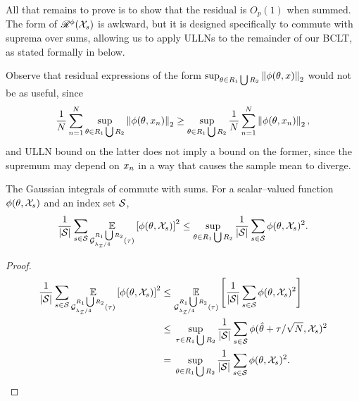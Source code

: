 
All that remains to prove  is to show that the residual is
$O_p(1)$ when summed.  The form of $\mathscr{R}^{\phi}({\mathcal{X}}_s)$ is awkward, but it is
designed specifically to commute with suprema over sums, allowing us to apply
ULLNs to the remainder of our BCLT, as stated formally in
 below.

Observe that residual expressions of the form $\sup_{\theta \in R_1 \bigcup R_2}
\left\Vert \phi(\theta, x)\right\Vert_2$ would not be as useful, since
%
\begin{align*}
%
\meann \sup_{\theta \in R_1 \bigcup R_2} \norm{\phi(\theta, \x_n)}_2 \ge
\sup_{\theta \in R_1 \bigcup R_2} \meann \norm{\phi(\theta, \x_n)}_2,
\end{align*}
%
and ULLN bound on the latter does not imply a bound on the former, since the
supremum may depend on $x_n$ in a way that causes the sample mean to diverge.


\begin{lem}
%
The Gaussian integrals of  commute with sums.
%
For a scalar--valued function $\phi(\theta, {\mathcal{X}}_s)$ and an index set
$\mathcal{S}$,
%
\begin{align*}
%
\means \expect{\normresid{\infoev / 4}{R_1 \bigcup R_2}(\tau)}
              {\phi(\theta, \xvec_s)}^2
            \le
\sup_{\theta \in R_1 \bigcup R_2} \means \phi(\theta, \xvec_s)^2.
%
\end{align*}
%
\begin{proof}
%
\begin{align*}
%
\means \expect{\normresid{\infoev / 4}{R_1 \bigcup R_2}(\tau)}
              {\phi(\theta, \xvec_s)}^2
\le{}&
\expect{\normresid{\infoev / 4}{R_1 \bigcup R_2}(\tau)}
              {\means \phi(\theta, \xvec_s)^2}
\\\le{}&
\sup_{\tau \in R_1 \bigcup R_2}
    \means \phi(\thetahat + \tau / \sqrt{N}, \xvec_s)^2
\\={}&
\sup_{\theta \in R_1 \bigcup R_2} \means \phi(\theta, \xvec_s)^2.
%
\end{align*}
%
\end{proof}
%
\end{lem}


